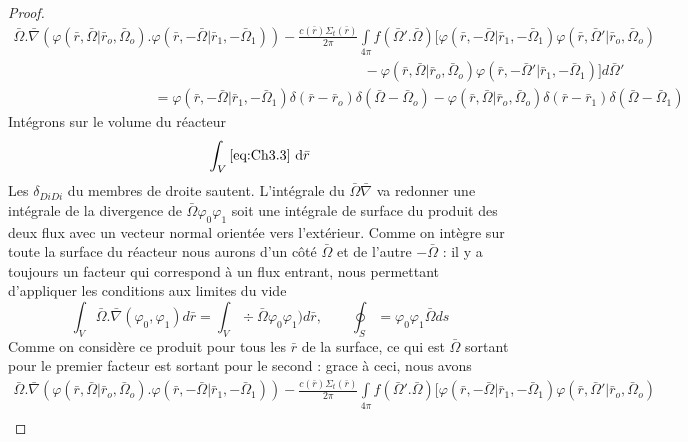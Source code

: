 \begin{proof}
\begin{equation}
\begin{array}{l}
\bar \Omega .\bar \nabla (\varphi (\bar r,\bar \Omega |{{\bar r}_o},{{\bar \Omega }_o}).\varphi (\bar r, - \bar \Omega |{{\bar r}_1}, - {{\bar \Omega }_1})) - \frac{{c(\bar r){\Sigma _t}(\bar r)}}{{2\pi }}\int\limits_{4\pi }    f(\bar \Omega '.\bar \Omega )[\varphi (\bar r, - \bar \Omega |{{\bar r}_1}, - {{\bar \Omega }_1})\varphi (\bar r,\bar \Omega '|{{\bar r}_o},{{\bar \Omega }_o})\\
\quad \quad \quad \quad \quad \quad \quad \quad \quad \quad \quad \quad \quad \quad \quad \quad \quad \quad \quad \quad \quad \quad \quad \quad \quad  - \varphi (\bar r,\bar \Omega |{{\bar r}_o},{{\bar \Omega }_o})\varphi (\bar r, - \bar \Omega '|{{\bar r}_1}, - {{\bar \Omega }_1})]d\bar \Omega '\\
\quad \quad \quad \quad \quad \quad \quad \quad \quad \quad  = \varphi (\bar r, - \bar \Omega |{{\bar r}_1}, - {{\bar \Omega }_1})\delta (\bar r - {{\bar r}_o})\delta (\bar \Omega  - {{\bar \Omega }_o}) - \varphi (\bar r,\bar \Omega |{{\bar r}_o},{{\bar \Omega }_o})\delta (\bar r - {{\bar r}_1})\delta (\bar \Omega  - {{\bar \Omega }_1})
\end{array}
\label{eq:Ch3.3}
\end{equation}
Intégrons sur le volume du réacteur
\begin{equation}
\int_V \eqref{eq:Ch3.3}\ \text{d}\bar r
\end{equation}
Les $\delta_{DiDi}$ du membres de droite sautent. L'intégrale du $\bar\Omega\bar\nabla$ va redonner
une intégrale de la divergence de $\bar\Omega\varphi_0\varphi_1$ soit une intégrale de surface du 
produit des deux flux avec un vecteur normal orientée vers l'extérieur. Comme on intègre sur toute 
la surface du réacteur nous aurons d'un côté $\bar\Omega$ et de l'autre $-\bar\Omega$ : il y a 
toujours un facteur qui correspond à un flux entrant, nous permettant d'appliquer les conditions 
aux limites du vide
\begin{equation}
\int_V \bar\Omega.\bar \nabla(\varphi_0,\varphi_1)d\bar r = \int_V \div \bar\Omega \varphi_0
\varphi_1)d\bar r,\qquad \oint_S = \varphi_0\varphi_1 \bar\Omega ds
\end{equation}
Comme on considère ce produit pour tous les $\bar r$ de la surface, ce qui est $\bar \Omega$ sortant
pour le premier facteur est sortant pour le second : grace à ceci, nous avons
\begin{equation}
\begin{array}{l}
\bar \Omega .\bar \nabla (\varphi (\bar r,\bar \Omega |{{\bar r}_o},{{\bar \Omega }_o}).\varphi (\bar r, - \bar \Omega |{{\bar r}_1}, - {{\bar \Omega }_1})) - \frac{{c(\bar r){\Sigma _t}(\bar r)}}{{2\pi }}\int\limits_{4\pi }   f(\bar \Omega '.\bar \Omega )[\varphi (\bar r, - \bar \Omega |{{\bar r}_1}, - {{\bar \Omega }_1})\varphi (\bar r,\bar \Omega '|{{\bar r}_o},{{\bar \Omega }_o})\\

\end{array}
\end{equation}
\end{proof}
